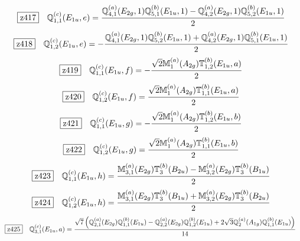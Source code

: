 \documentclass[fleqn,10pt,landscape]{jsarticle}
\begin{document}
\begin{dmath*}
\hspace*{3mm}\fbox{z417}\quad \mathbb{Q}_{1,1}^{(c)}(E_{1u},e)=\frac{\mathbb{Q}_{4,1}^{(a)}(E_{2g},1) \mathbb{Q}_{5,1}^{(b)}(E_{1u},1) - \mathbb{Q}_{4,2}^{(a)}(E_{2g},1) \mathbb{Q}_{5,2}^{(b)}(E_{1u},1)}{2}
\end{dmath*}
\begin{dmath*}
\hspace*{3mm}\fbox{z418}\quad \mathbb{Q}_{1,2}^{(c)}(E_{1u},e)=- \frac{\mathbb{Q}_{4,1}^{(a)}(E_{2g},1) \mathbb{Q}_{5,2}^{(b)}(E_{1u},1) + \mathbb{Q}_{4,2}^{(a)}(E_{2g},1) \mathbb{Q}_{5,1}^{(b)}(E_{1u},1)}{2}
\end{dmath*}
\begin{dmath*}
\hspace*{3mm}\fbox{z419}\quad \mathbb{Q}_{1,1}^{(c)}(E_{1u},f)=- \frac{\sqrt{2} \mathbb{M}_{1}^{(a)}(A_{2g}) \mathbb{T}_{1,2}^{(b)}(E_{1u},a)}{2}
\end{dmath*}
\begin{dmath*}
\hspace*{3mm}\fbox{z420}\quad \mathbb{Q}_{1,2}^{(c)}(E_{1u},f)=\frac{\sqrt{2} \mathbb{M}_{1}^{(a)}(A_{2g}) \mathbb{T}_{1,1}^{(b)}(E_{1u},a)}{2}
\end{dmath*}
\begin{dmath*}
\hspace*{3mm}\fbox{z421}\quad \mathbb{Q}_{1,1}^{(c)}(E_{1u},g)=- \frac{\sqrt{2} \mathbb{M}_{1}^{(a)}(A_{2g}) \mathbb{T}_{1,2}^{(b)}(E_{1u},b)}{2}
\end{dmath*}
\begin{dmath*}
\hspace*{3mm}\fbox{z422}\quad \mathbb{Q}_{1,2}^{(c)}(E_{1u},g)=\frac{\sqrt{2} \mathbb{M}_{1}^{(a)}(A_{2g}) \mathbb{T}_{1,1}^{(b)}(E_{1u},b)}{2}
\end{dmath*}
\begin{dmath*}
\hspace*{3mm}\fbox{z423}\quad \mathbb{Q}_{1,1}^{(c)}(E_{1u},h)=\frac{\mathbb{M}_{3,1}^{(a)}(E_{2g}) \mathbb{T}_{3}^{(b)}(B_{2u}) - \mathbb{M}_{3,2}^{(a)}(E_{2g}) \mathbb{T}_{3}^{(b)}(B_{1u})}{2}
\end{dmath*}
\begin{dmath*}
\hspace*{3mm}\fbox{z424}\quad \mathbb{Q}_{1,2}^{(c)}(E_{1u},h)=\frac{\mathbb{M}_{3,1}^{(a)}(E_{2g}) \mathbb{T}_{3}^{(b)}(B_{1u}) + \mathbb{M}_{3,2}^{(a)}(E_{2g}) \mathbb{T}_{3}^{(b)}(B_{2u})}{2}
\end{dmath*}
\begin{dmath*}
\hspace*{3mm}\fbox{z425}\quad \mathbb{Q}_{3,1}^{(c)}(E_{1u},a)=\frac{\sqrt{7} \left(\mathbb{Q}_{2,1}^{(a)}(E_{2g}) \mathbb{Q}_{1,1}^{(b)}(E_{1u}) - \mathbb{Q}_{2,2}^{(a)}(E_{2g}) \mathbb{Q}_{1,2}^{(b)}(E_{1u}) + 2 \sqrt{3} \mathbb{Q}_{2}^{(a)}(A_{1g}) \mathbb{Q}_{1,1}^{(b)}(E_{1u})\right)}{14}
\end{dmath*}
\end{document}
